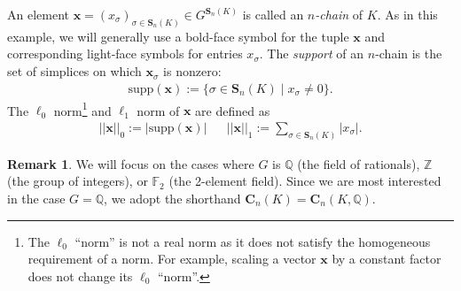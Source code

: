 \documentclass[utf8]{formatting_stuff/frontiersFPHY}
\newcommand{\Z}{\mathbb{Z}}
\newcommand{\Q}{\mathbb{Q}}
\newcommand{\field}{\mathbb{F}}
\newcommand{\Chains}{\mathbf{C}}
\newcommand{\Simplices}[0]{\mathbf{S}}
\newcommand{\optimalrep}{\mathbf{x}}
\newcommand{\orepentry}{x}
\newcommand{\supp}{\mathrm{supp}}
\theoremstyle{plain}
\theoremstyle{definition}
\newtheorem{remark}[theorem]{Remark}
\begin{document}
An element $\optimalrep = (\orepentry_\sigma)_{\sigma \in \Simplices_n(K)} \in G^{\Simplices_n(K)}$ is called an \emph{$n$-chain} of $K$.   As  in this example, we will generally use a bold-face symbol for the tuple $\optimalrep$ and corresponding light-face symbols for entries $\orepentry_\sigma$.  The \emph{support} of an $n$-chain is the set of simplices on which $\optimalrep_\sigma$ is nonzero:  
%
    \begin{align*}
        \supp(\optimalrep)  :=\{ \sigma \in \Simplices_n(K) \mid \orepentry_\sigma \neq 0 \}.
    \end{align*}
%
The $\ell_0$ norm\footnote{The $\ell_0$ ``norm'' is not a real norm as it does not satisfy the homogeneous requirement of a norm. For example, scaling a vector $\optimalrep$ by a constant factor does not change its $\ell_0$ ``norm''.} and  $\ell_1$ norm  of $\optimalrep$ are defined as 
    \begin{align*}
        ||\optimalrep||_0 := |\supp(\optimalrep) |
        &&
        \textstyle
        ||\optimalrep||_1 := \sum_{ \sigma \in \Simplices_n(K)} | \orepentry_\sigma  |.
    \end{align*}

\begin{remark}
We will focus on the cases where $G$ is $\Q$ (the field of rationals), $\Z$ (the group of integers), or $\field_2$ (the 2-element field).  Since we are most interested in the case $G = \Q$, we adopt the shorthand $\Chains_n(K) = \Chains_n(K,\mathbb{Q})$. 
\end{remark}

 

 
 
\end{document}
